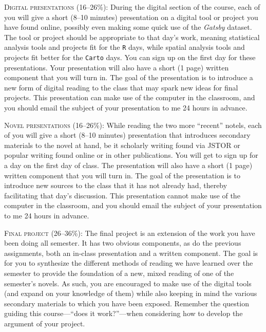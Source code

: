 \begin{description}
  \item \textsc{Digital presentations (16–26\%):} During the digital section of
    the course, each of you will give a short (8–10 minutes) presentation on a
    digital tool or project you have found online, possibly even making some
    quick use of the \textit{Gatsby} dataset. The tool or project should be
    appropriate to that day’s work, meaning statistical analysis tools and
    projects fit for the \texttt{R} days, while spatial analysis tools and
    projects fit better for the \texttt{Carto} days. You can sign up on the
    first day for these presentations. Your presentation will also have a short
    (1 page) written component that you will turn in. The goal of the
    presentation is to introduce a new form of digital reading to the class
    that may spark new ideas for final projects. This presentation can make use
    of the computer in the classroom, and you should email the subject of your
    presentation to me 24 hours in advance.

  \item \textsc{Novel presentations (16–26\%):} While reading the two more
    “recent” notels, each of you will give a short (8–10 minutes) presentation
    that introduces secondary materials to the novel at hand, be it scholarly
    writing found via JSTOR or popular writing found online or in other
    publications. You will get to sign up for a day on the first day of class.
    The presentation will also have a short (1 page) written component that you
    will turn in. The goal of the presentation is to introduce new sources to
    the class that it has not already had, thereby facilitating that day’s
    discussion. This presentation cannot make use of the computer in the
    classroom, and you should email the subject of your presentation to me 24
    hours in advance.

  \item \textsc{Final project (26–36\%):} The final project is an extension of
    the work you have been doing all semester. It has two obvious components,
    as do the previous assignments, both an in-class presentation and a written
    component. The goal is for you to synthesize the different methods of
    reading we have learned over the semester to provide the foundation of a
    new, mixed reading of one of the semester’s novels. As such, you are
    encouraged to make use of the digital tools (and expand on your knowledge
    of them) while also keeping in mind the various secondary materials to
    which you have been exposed.  Remember the question guiding this
    course—“does it work?”—when considering how to develop the argument of your
    project. 


\end{description}
